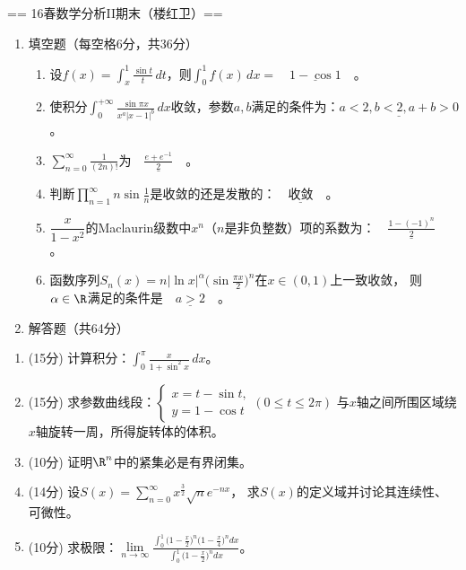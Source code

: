 == 16春数学分析II期末（楼红卫）==
\begin{enumerate}[label=\Roman*.]
\item 填空题（每空格6分，共36分）
\begin{enumerate}[label=(\arabic*)]
    \item 设$\displaystyle f(x)=\int_x^1\frac{\sin t}{t}\,dt$，则$\displaystyle \int_0^1f(x)\,dx=\underline{\quad 1-\cos1 \quad}$。
    \item 使积分$\displaystyle \int_0^{+\infty}\frac{\sin\pi x}{x^a|x-1|^b}\,dx$收敛，参数$a,b$满足的条件为：$\underline{a<2,b<2,a+b>0}$。
    \item $\displaystyle \sum_{n=0}^\infty\frac{1}{(2n)!}$为$\underline{\quad \frac{e+e^{-1}}{2} \quad}$。
    \item 判断$\displaystyle \prod_{n=1}^\infty n\sin\frac{1}{n}$是收敛的还是发散的：$\underline{\quad 收敛 \quad}$。
    \item $\dfrac{x}{1-x^2}$的Maclaurin级数中$x^n$（$n$是非负整数）项的系数为：$\underline{\quad \frac{1-(-1)^n}{2} \quad}$。
    \item 函数序列$\displaystyle S_n(x)=n|\ln x|^\alpha\Big(\sin\frac{\pi x}{2}\Big)^n$在$x\in(0,1)$上一致收敛，
    则$\alpha\in\R$满足的条件是$\underline{\quad a>2 \quad}$。
\end{enumerate}
\item 解答题（共64分）
\end{enumerate}
\begin{enumerate}[label=\arabic*]
\item (15分) 计算积分：$\displaystyle \int_0^\pi \frac{x}{1+\sin^2x}\,dx$。

\item (15分) 求参数曲线段：$\begin{cases}x=t-\sin t,\\y=1-\cos t\end{cases}(0 \le t \le 2\pi)$
与$x$轴之间所围区域绕$x$轴旋转一周，所得旋转体的体积。

\item (10分) 证明$\R^n$中的紧集必是有界闭集。

\item (14分) 设$\displaystyle S(x)=\sum_{n=0}^\infty x^\frac{3}{2}\sqrt{n}e^{-nx}$，
求$S(x)$的定义域并讨论其连续性、可微性。

\item (10分) 求极限：$\lim\limits_{n\to\infty}\frac{\displaystyle \int_0^1\Big(1-\frac{x}{2}\Big)^n\Big(1-\frac{x}{4}\Big)^ndx}{\displaystyle \int_0^1\Big(1-\frac{x}{2}\Big)^ndx}$。
\end{enumerate}
